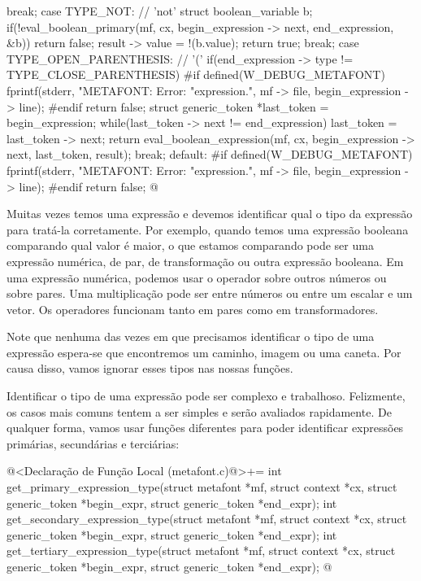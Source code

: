 {{{    break;
    case TYPE_NOT: // 'not'
      struct boolean_variable b;
      if(!eval_boolean_primary(mf, cx, begin_expression -> next, end_expression,
                              &b))
        return false;
      result -> value = !(b.value);
      return true;
    break;
    case TYPE_OPEN_PARENTHESIS: // '('
      if(end_expression -> type != TYPE_CLOSE_PARENTHESIS){
#if defined(W_DEBUG_METAFONT)
      fprintf(stderr, "METAFONT: Error: %
              "expression.\n",  mf -> file, begin_expression -> line);
#endif
        return false;
      }
      struct generic_token *last_token = begin_expression;
      while(last_token -> next != end_expression)
        last_token = last_token -> next;
      return eval_boolean_expression(mf, cx, begin_expression -> next,
                                     last_token, result);
    break;
    default:
#if defined(W_DEBUG_METAFONT)
      fprintf(stderr, "METAFONT: Error: %
              "expression.\n",  mf -> file, begin_expression -> line);
#endif
    return false;
  }
}
@
\fimcodigo


Muitas vezes temos uma expressão e devemos identificar qual o tipo da
expressão para tratá-la corretamente. Por exemplo, quando temos uma
expressão booleana comparando qual valor é maior, o que estamos
comparando pode ser uma expressão numérica, de par, de transformação
ou outra expressão booleana. Em uma expressão numérica, podemos usar o
operador  sobre outros números ou sobre pares. Uma
multiplicação pode ser entre números ou entre um escalar e um
vetor. Os operadores  funcionam tanto em pares como
em transformadores.

Note que nenhuma das vezes em que precisamos identificar o tipo de uma
expressão espera-se que encontremos um caminho, imagem ou uma caneta. Por
causa disso, vamos ignorar esses tipos nas nossas funções.

Identificar o tipo de uma expressão pode ser complexo e
trabalhoso. Felizmente, os casos mais comuns tentem a ser simples e
serão avaliados rapidamente. De qualquer forma, vamos usar funções
diferentes para poder identificar expressões primárias, secundárias e
terciárias:

\iniciocodigo
@<Declaração de Função Local (metafont.c)@>+=
int get_primary_expression_type(struct metafont *mf, struct context *cx,
                               struct generic_token *begin_expr,
                               struct generic_token *end_expr);
int get_secondary_expression_type(struct metafont *mf, struct context *cx,
                                 struct generic_token *begin_expr,
                                 struct generic_token *end_expr);
int get_tertiary_expression_type(struct metafont *mf, struct context *cx,
                                struct generic_token *begin_expr,
                                struct generic_token *end_expr);
@
\fimcodigo

}
